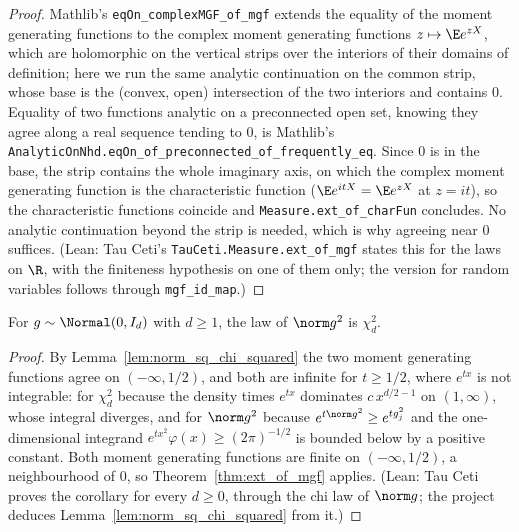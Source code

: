 \begin{proof}
\leanok
Mathlib's \texttt{eqOn\_complexMGF\_of\_mgf} extends the equality of the moment generating
functions to the complex moment generating functions $z \mapsto \E e^{zX}$, which are holomorphic
on the vertical strips over the interiors of their domains of definition; here we run the same
analytic continuation on the common strip, whose base is the (convex, open) intersection of the
two interiors and contains $0$. Equality of two functions analytic on a preconnected open set,
knowing they agree along a real sequence tending to $0$, is Mathlib's
\texttt{AnalyticOnNhd.eqOn\_of\_preconnected\_of\_frequently\_eq}. Since $0$ is in the base, the
strip contains the whole imaginary axis, on which the complex moment generating function is the
characteristic function ($\E e^{itX} = \E e^{zX}$ at $z = it$), so the characteristic functions
coincide and \texttt{Measure.ext\_of\_charFun} concludes. No analytic continuation beyond the
strip is needed, which is why agreeing near $0$ suffices. (Lean: Tau Ceti's
\texttt{TauCeti.Measure.ext\_of\_mgf} states this for the laws on $\R$, with the finiteness
hypothesis on one of them only; the version for random variables follows through
\texttt{mgf\_id\_map}.)
\end{proof}

\begin{corollary}
\label{cor:norm_sq_chi_squared_law}
\leanok
{}
For $g \sim \Normal(0,I_d)$ with $d \ge 1$, the law of $\norm g^2$ is $\chi^2_d$.
\end{corollary}

\begin{proof}
\leanok
{}
By Lemma~\ref{lem:norm_sq_chi_squared} the two moment generating functions agree on
$(-\infty,1/2)$, and both are infinite for $t \ge 1/2$, where $e^{tx}$ is not integrable: for
$\chi^2_d$ because the density times $e^{tx}$ dominates $c\,x^{d/2-1}$ on $(1,\infty)$, whose
integral diverges, and for $\norm g^2$ because $e^{t\norm g^2} \ge e^{tg_j^2}$ and the
one-dimensional integrand $e^{tx^2}\varphi(x) \ge (2\pi)^{-1/2}$ is bounded below by a positive
constant. Both moment generating functions are finite on $(-\infty,1/2)$, a neighbourhood of $0$,
so Theorem~\ref{thm:ext_of_mgf} applies. (Lean: Tau Ceti proves the corollary for every $d \ge 0$,
through the chi law of $\norm g$; the project deduces Lemma~\ref{lem:norm_sq_chi_squared} from
it.)
\end{proof}

